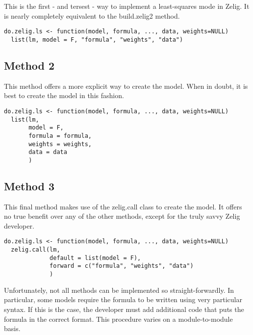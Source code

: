 \documentclass[a4paper, 11pt]{article}
\begin{document}
This is the first - and tersest - way to implement a least-squares mode in Zelig.  It is nearly completely equivalent to the build.zelig2 method.

\begin{lstlisting}
do.zelig.ls <- function(model, formula, ..., data, weights=NULL) 
  list(lm, model = F, "formula", "weights", "data")
\end{lstlisting}

\vspace{3 mm}

\subsection*{Method 2}

This method offers a more explicit way to create the model.  When in doubt, it is best to create the model in this fashion.

\begin{lstlisting}
do.zelig.ls <- function(model, formula, ..., data, weights=NULL)
  list(lm,
       model = F,
       formula = formula,
       weights = weights,
       data = data
       )
\end{lstlisting}

\vspace{3 mm}


\subsection*{Method 3}

This final method makes use of the zelig.call class to create the model.  It offers no true benefit over any of the other methods, except for the truly savvy Zelig developer.

\begin{lstlisting}
do.zelig.ls <- function(model, formula, ..., data, weights=NULL)
  zelig.call(lm,
             default = list(model = F),
             forward = c("formula", "weights", "data")
             )
\end{lstlisting}

\vspace{6 mm}

Unfortunately, not all methods can be implemented so straight-forwardly.  In particular, some models require the formula to be written using very particular syntax.  If this is the case, the developer must add additional code that puts the formula in the correct format.  This procedure varies on a module-to-module basis.
\end{document}
